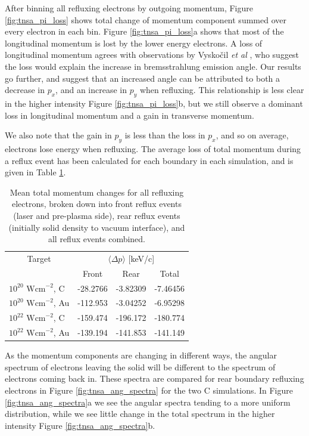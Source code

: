 \documentclass[12pt]{article}
\numberwithin{equation}{section}
\begin{document}
After binning all refluxing electrons by outgoing momentum, Figure \ref{fig:tnsa_pi_loss} shows total change of momentum component summed over every electron in each bin. Figure \ref{fig:tnsa_pi_loss}a shows that most of the longitudinal momentum is lost by the lower energy electrons. A loss of longitudinal momentum agrees with observations by Vysko\v{c}il \textit{et al} \cite{bremPIC:Vyskocil}, who suggest the loss would explain the increase in bremsstrahlung emission angle. Our results go further, and suggest that an increased angle can be attributed to both a decrease in $p_x$, and an increase in $p_y$ when refluxing. This relationship is less clear in the higher intensity Figure \ref{fig:tnsa_pi_loss}b, but we still observe a dominant loss in longitudinal momentum and a gain in transverse momentum.

We also note that the gain in $p_y$ is less than the loss in $p_x$, and so on average, electrons lose energy when refluxing. The average loss of total momentum during a reflux event has been calculated for each boundary in each simulation, and is given in Table \ref{table:tnsa_dp}.

\begin{table}[h!]
\centering
\begin{tabular}{l c c c}
\toprule
\multicolumn{1}{c}{Target} & \multicolumn{3}{c}{$\langle\Delta p\rangle$ [keV/c]} \\
 & Front & Rear & Total \\
\midrule
$10^{20} \text{ Wcm}^{-2}$, C & -28.2766 & -3.82309 & -7.46456 \\
$10^{20} \text{ Wcm}^{-2}$, Au & -112.953 & -3.04252 & -6.95298 \\
$10^{22} \text{ Wcm}^{-2}$, C & -159.474 & -196.172 & -180.774 \\
$10^{22} \text{ Wcm}^{-2}$, Au & -139.194 & -141.853 & -141.149 \\
\bottomrule
\end{tabular}
\caption{Mean total momentum changes for all refluxing electrons, broken down into front reflux events (laser and pre-plasma side), rear reflux events (initially solid density to vacuum interface), and all reflux events combined.}
\label{table:tnsa_dp} 
\end{table}

As the momentum components are changing in different ways, the angular spectrum of electrons leaving the solid will be different to the spectrum of electrons coming back in. These spectra are compared for rear boundary refluxing electrons in Figure \ref{fig:tnsa_ang_spectra} for the two C simulations. In Figure \ref{fig:tnsa_ang_spectra}a  we see the angular spectra tending to a more uniform distribution, while we see little change in the total spectrum in the higher intensity Figure \ref{fig:tnsa_ang_spectra}b.
\end{document}
